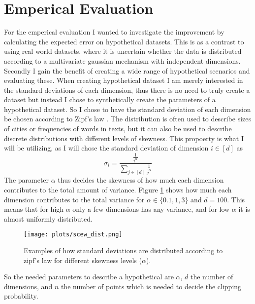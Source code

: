 \documentclass[a4paper,12pt]{article}
\begin{document}
\section{Emperical Evaluation}
\label{sec:emperical}
For the emperical evaluation I wanted to investigate the 
improvement by calculating the expected error on hypothetical datasets. 
This is as a contrast to using real world datasets, where it is uncertain whether
the data is distributed according to a multivariate gaussian mechanism with independent dimensions.
Secondly I gain the benefit of creating a wide range of hypothetical scenarios and evaluating these.
When creating hypothetical dataset I am merely interested in the standard deviations of each dimension,
thus there is no need to truly create a dataset but instead I chose to 
synthetically create the parameters of a hypothetical dataset.
So I chose to have the standard deviation of each dimension be chosen according 
to Zipf's law \cite{zipf}. The distribution is often used to describe 
sizes of cities or frequencies of words in texts, but it can also be used to 
describe discrete distributions with different levels of skewness. 
This propoerty is what I will be utilizing, as I will chose the 
standard deviation of dimension $i \in [d]$ as
\[
    \sigma_i = \frac{ \frac{1}{i^\alpha}}{\sum_{j \in [d]} \frac{1}{j^\alpha}}
\]
The parameter $\alpha$ thus decides the skewness of how much each dimension contributes to the total amount of variance.
Figure \ref{fig:skew} shows how much each dimension contributes to the total variance for
$\alpha \in \{0.1,1,3\}$ and $d = 100$. This means that for high $\alpha$ only a few dimensions has any variance, 
and for low $\alpha$ it is almost uniformly distributed.
\begin{figure}[h!]
\label{fig:skew}
\texttt{[image: plots/scew\_dist.png]}
\caption{Examples of how standard deviations are distributed according to 
zipf's law for different skewness levels ($\alpha$).} 
\end{figure}

So the needed parameters to describe a hypothetical are $\alpha$, $d$ the number of dimensions, and 
$n$ the number of points which is needed to decide the clipping probability.
\end{document}
